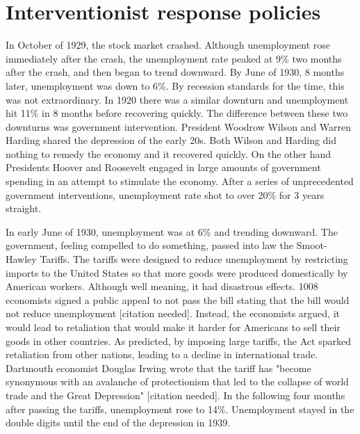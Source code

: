 \documentclass{article}
\begin{document}
\section{Interventionist response policies}

In October of 1929, the stock market crashed. Although unemployment rose
immediately after the crash, the unemployment rate peaked at 9\% two months
after the crash, and then began to trend downward. By June of 1930, 8 months
later, unemployment was down to 6\%. By recession standards for the time, this
was not extraordinary. In 1920 there was a similar downturn and unemployment
hit 11\% in 8 months before recovering quickly. The difference between these
two downturns was government intervention. President Woodrow Wilson and Warren
Harding shared the depression of the early 20s. Both Wilson and Harding did
nothing to remedy the economy and it recovered quickly. On the other hand
Presidents Hoover and Roosevelt engaged in large amounts of government spending
in an attempt to stimulate the economy. After a series of unprecedented
government interventions, unemployment rate shot to over 20\% for 3 years
straight.

In early June of 1930, unemployment was at 6\% and trending downward. The
government, feeling compelled to do something, passed into law the Smoot-Hawley
Tariffs. The tariffs were designed to reduce unemployment by restricting
imports to the United States so that more goods were produced domestically by
American workers. Although well meaning, it had disastrous effects. 1008
economists signed a public appeal to not pass the bill stating that the bill
would not reduce unemployment [citation needed]. Instead, the economists
argued, it would lead to retaliation that would make it harder for Americans to
sell their goods in other countries. As predicted, by imposing large tariffs,
the Act sparked retaliation from other nations, leading to a decline in
international trade. Dartmouth economist Douglas Irwing wrote that the tariff
has "become synonymous with an avalanche of protectionism that led to the
collapse of world trade and the Great Depression" [citation needed]. In the
following four months after passing the tariffs, unemployment rose to 14\%.
Unemployment stayed in the double digits until the end of the depression in
1939.
\end{document}
